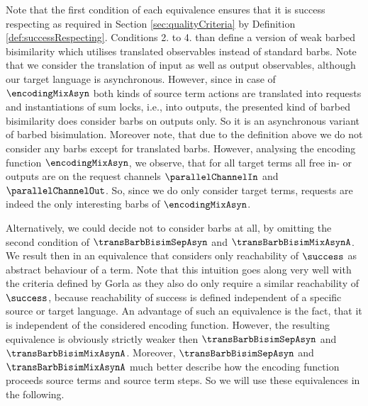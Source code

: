 \documentclass[]{llncs}
\begin{document}
Note that the first condition of each equivalence ensures that it is success respecting as required in Section \ref{sec:qualityCriteria} by Definition \ref{def:successRespecting}. Conditions 2. to 4. than define a version of weak barbed bisimilarity which utilises translated observables instead of standard barbs. Note that we consider the translation of input as well as output observables, although our target language is asynchronous. However, since in case of $ \encodingMixAsyn $ both kinds of source term actions are translated into requests and instantiations of sum locks, i.e., into outputs, the presented kind of barbed bisimilarity does consider barbs on outputs only. So it is an asynchronous variant of barbed bisimulation. Moreover note, that due to the definition above we do not consider any barbs except for translated barbs. However, analysing the encoding function $ \encodingMixAsyn $, we observe, that for all target terms all free in- or outputs are on the request channels $ \parallelChannelIn $ and $ \parallelChannelOut $. So, since we do only consider target terms, requests are indeed the only interesting barbs of $ \encodingMixAsyn $.

Alternatively, we could decide not to consider barbs at all, by omitting the second condition of $ \transBarbBisimSepAsyn $ and $ \transBarbBisimMixAsynA $. We result then in an equivalence that considers only reachability of $ \success $ as abstract behaviour of a term. Note that this intuition goes along very well with the criteria defined by Gorla as they also do only require a similar reachability of $ \success $, because reachability of success is defined independent of a specific source or target language. An advantage of such an equivalence is the fact, that it is independent of the considered encoding function. However, the resulting equivalence is obviously strictly weaker then $ \transBarbBisimSepAsyn $ and $ \transBarbBisimMixAsynA $. Moreover, $ \transBarbBisimSepAsyn $ and $ \transBarbBisimMixAsynA $ much better describe how the encoding function proceeds source terms and \simulate source term steps. So we will use these equivalences in the following.
\end{document}
